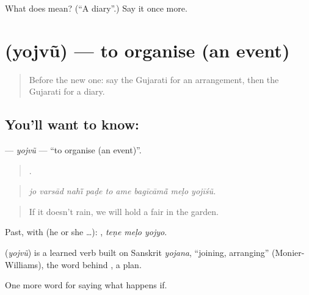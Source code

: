 \begin{tcolorbox}[breakable,colback=teal!4,colframe=teal!35!black,title={Before you move on}]
What does  mean? (\textquotedblleft{}A diary\textquotedblright{}.) Say it once more.
\end{tcolorbox}
\section[\texorpdfstring{\gu{યોજવું} (yojvũ)}{યોજવું (yojvũ)}]{ (yojvũ) — to organise (an event)}

\label{lesson:GU-C528-yojvu}



\begin{quote}
Before the new one: say the Gujarati for an arrangement, then the Gujarati for a diary.
\end{quote}

\subsection*{You'll want to know: }
\textbf{} — \emph{yojvũ} — \textquotedblleft{}to organise (an event)\textquotedblright{}.

\begin{quote}
        .
\end{quote}

\begin{quote}
\emph{jo varsād nahī̃ paḍe to ame bagīcāmā̃ meḷo yojīśũ.}
\end{quote}

\begin{quote}
If it doesn't rain, we will hold a fair in the garden.
\end{quote}

Past, with  (he or she …):   , \emph{teṇe meḷo yojyo}.

\begin{cousinweb}
\textbf{} (\emph{yojvũ}) is a learned verb built on Sanskrit \emph{yojana}, \textquotedblleft{}joining, arranging\textquotedblright{} (Monier-Williams), the word behind \textbf{}, a plan.
\end{cousinweb}

\begin{grammarlens}[title={What you've built}]
One more word for saying what happens if.
\end{grammarlens}

